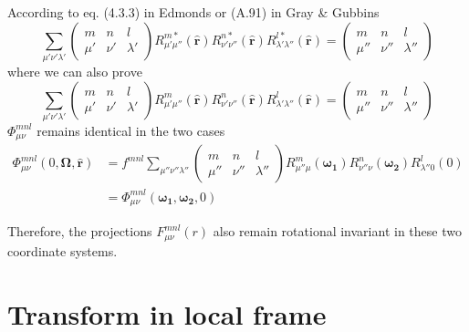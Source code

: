 According to eq. (4.3.3) in Edmonds \citep{Edmonds} or (A.91) in
Gray \& Gubbins \citep{Gray-Gubbins}
\begin{equation}
\sum_{\mu'\nu'\lambda'}\left(\begin{array}{ccc}
m & n & l\\
\mu' & \nu' & \lambda'
\end{array}\right)R_{\mu'\mu''}^{m*}(\mathbf{\hat{r}})R_{\nu'\nu''}^{n*}(\mathbf{\hat{r}})R_{\lambda'\lambda''}^{l*}(\mathbf{\hat{r}})=\left(\begin{array}{ccc}
m & n & l\\
\mu'' & \nu'' & \lambda''
\end{array}\right)
\end{equation}
where we can also prove
\begin{equation}
\sum_{\mu'\nu'\lambda'}\left(\begin{array}{ccc}
m & n & l\\
\mu' & \nu' & \lambda'
\end{array}\right)R_{\mu'\mu''}^{m}(\mathbf{\hat{r}})R_{\nu'\nu''}^{n}(\mathbf{\hat{r}})R_{\lambda'\lambda''}^{l}(\mathbf{\hat{r}})=\left(\begin{array}{ccc}
m & n & l\\
\mu'' & \nu'' & \lambda''
\end{array}\right)
\end{equation}
$\Phi_{\mu\nu}^{mnl}$ remains identical in the two cases
\begin{align}
\Phi_{\mu\nu}^{mnl}(0,\mathbf{\Omega},\mathbf{\hat{r}}) & =f^{mnl}\sum_{\mu''\nu''\lambda''}\left(\begin{array}{ccc}
m & n & l\\
\mu'' & \nu'' & \lambda''
\end{array}\right)R_{\mu''\mu}^{m}(\boldsymbol{\omega_{1}})R_{\nu''\nu}^{n}(\boldsymbol{\omega_{2}})R_{\lambda''0}^{l}(0)\nonumber \\
 & =\Phi_{\mu\nu}^{mnl}(\boldsymbol{\omega_{1}},\boldsymbol{\omega_{2}},0)
\end{align}


Therefore, the projections $F_{\mu\nu}^{mnl}(r)$ also remain rotational
invariant in these two coordinate systems.


\section{Transform in local frame}

